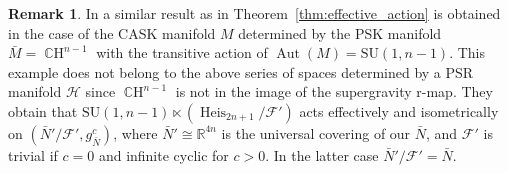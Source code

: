 \documentclass{article}
\theoremstyle{definition}
\newtheorem{remark}[theorem]{Remark}
\DeclareMathOperator{\Aut}{Aut}
\DeclareMathOperator{\Heis}{Heis}
\DeclareMathOperator{\CH}{\mathbb{C}\mathrm{H}}
\newcommand{\R}{\mathbb{R}}
\newcommand{\calF}{\mathcal{F}}
\newcommand{\calH}{\mathcal{H}}
\newcommand{\SU}{\mathrm{SU}}
\begin{document}
    \begin{remark}
        In \cite[Theorem~3.16]{CRT21} a similar result as in Theorem~\ref{thm:effective_action} is obtained in the case of the CASK manifold $M$ determined by the PSK manifold $\bar M=\CH^{n-1}$ with the transitive action of $\Aut(M)=\SU(1,n-1)$. This example does not belong to the above series of spaces determined by a PSR manifold $\calH$ since $\CH^{n-1}$ is not in the image of the supergravity r-map. They obtain that $\SU(1,n-1)\ltimes(\Heis_{2n+1}/\calF')$ acts effectively and isometrically on $(\bar N'/\calF',g_{\bar N}^c)$, where $\bar{N}'\cong\R^{4n}$ is the universal covering of our $\bar N$, and $\calF'$ is trivial if $c=0$ and infinite cyclic for $c>0$. In the latter case $\bar{N}'/\calF'=\bar N$.
    \end{remark}
    
    
    
    
\end{document}
